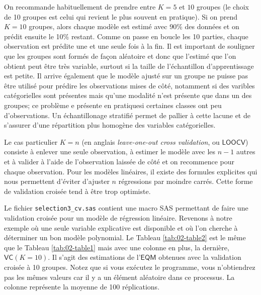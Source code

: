 \documentclass[
  11pt,
  letterpaper,
]{book}
\theoremstyle{definition}
\theoremstyle{definition}
\theoremstyle{definition}
\theoremstyle{remark}
\begin{document}
On recommande habituellement de prendre entre \(K=5\) et \(10\) groupes (le choix de 10 groupes est celui qui revient le plus souvent en pratique). Si on prend \(K=10\) groupes, alors chaque modèle est estimé avec 90\% des données et on prédit ensuite le 10\% restant. Comme on passe en boucle les 10 parties, chaque observation est prédite une et une seule fois à la fin. Il est important de souligner que les groupes sont formés de façon aléatoire et donc que l'estimé que l'on obtient peut être très variable, surtout si la taille de l'échantillon d'apprentissage est petite. Il arrive également que le modèle ajusté sur un groupe ne puisse pas être utilisé pour prédire les observations mises de côté, notamment si des varibles catégorielles sont présentes mais qu'une modalité n'est présente que dans un des groupes; ce problème e présente en pratiquesi certaines classes ont peu d'observations. Un échantillonage stratifié permet de pallier à cette lacune et de s'assurer d'une répartition plus homogène des variables catégorielles.

Le cas particulier \(K=n\) (en anglais \emph{leave-one-out cross validation}, ou \(\mathsf{LOOCV}\)) consiste à enlever une seule observation, à estimer le modèle avec les \(n-1\) autres et à valider à l'aide de l'observation laissée de côté et on recommence pour chaque observation. Pour les modèles linéaires, il existe des formules explicites qui nous permettent d'éviter d'ajuster \(n\) régressions par moindre carrés. Cette forme de validation croisée tend à être trop optimiste.

Le fichier \texttt{selection3\_cv.sas} contient une macro SAS permettant de faire une validation croisée pour un modèle de régression linéaire.
Revenons à notre exemple où une seule variable explicative est disponible et où l'on cherche à déterminer un bon modèle polynomial. Le Tableau \ref{tab:02-table2} est le même que le Tableau \ref{tab:02-table1} mais avec une colonne en plus, la dernière, \(\mathsf{VC} (K=10)\). Il s'agit des estimations de l'\(\mathsf{EQM}\) obtenues avec la validation croisée à 10 groupes. Notez que si vous exécutez le programme, vous n'obtiendrez pas les mêmes valeurs car il y a un élément aléatoire dans ce processus. La colonne représente la moyenne de 100 réplications.
\end{document}
